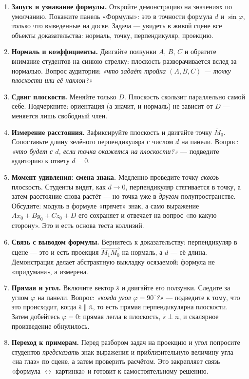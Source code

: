 \begin{enumerate}
  \item \textbf{Запуск и узнавание формулы.} Откройте демонстрацию на
    значениях по умолчанию. Покажите панель «Формулы»: это в точности
    формула $d$ и $\sin\varphi$, только что выведенные на доске. Задача
    --- увидеть в живой сцене все объекты доказательства: нормаль,
    точку, перпендикуляр, проекцию.

  \item \textbf{Нормаль и коэффициенты.} Двигайте ползунки $A$, $B$,
    $C$ и обратите внимание студентов на синюю стрелку: плоскость
    разворачивается вслед за нормалью. Вопрос аудитории: \emph{«что
    задаёт тройка $(A,B,C)$ --- точку плоскости или её наклон?»}

  \item \textbf{Сдвиг плоскости.} Меняйте только $D$. Плоскость
    скользит параллельно самой себе. Подчеркните: ориентация (а значит,
    и нормаль) не зависит от $D$ --- меняется лишь свободный член.

  \item \textbf{Измерение расстояния.} Зафиксируйте плоскость и двигайте
    точку $\bar{M}_0$. Сопоставьте длину зелёного перпендикуляра с
    числом $d$ на панели. Вопрос: \emph{«что будет с $d$, если точка
    окажется на плоскости?»} --- подведите аудиторию к ответу $d=0$.

  \item \textbf{Момент удивления: смена знака.} Медленно проведите точку
    \emph{сквозь} плоскость. Студенты видят, как $d \to 0$, перпендикуляр
    стягивается в точку, а затем расстояние снова растёт --- но точка уже
    в \emph{другом} полупространстве. Обсудите: модуль в формуле «прячет»
    знак, а само выражение $Ax_0+By_0+Cz_0+D$ его сохраняет и отвечает на
    вопрос «по какую сторону». Это и есть основа теста коллизий.

  \item \textbf{Связь с выводом формулы.} Вернитесь к доказательству:
    перпендикуляр в сцене --- это и есть проекция $\overrightarrow{M_1M_0}$
    на нормаль, а $d$ --- её длина. Демонстрация делает абстрактную
    выкладку осязаемой: формула не «придумана», а измерена.

  \item \textbf{Прямая и угол.} Включите вектор $\bar{s}$ и двигайте его
    ползунки. Следите за углом $\varphi$ на панели. Вопрос: \emph{«когда
    угол $\varphi = 90^\circ$?»} --- подведите к тому, что это
    происходит, когда $\bar{s} \parallel \bar{n}$, то есть прямая
    перпендикулярна плоскости. Затем добейтесь $\varphi = 0$: прямая
    легла в плоскость, $\bar{s} \perp \bar{n}$, и скалярное произведение
    обнулилось.

  \item \textbf{Переход к примерам.} Перед разбором задач на проекцию и
    угол попросите студентов \emph{предсказать} знак выражения и
    приблизительную величину угла «на глаз» по сцене, а затем проверить
    расчётом. Это закрепляет связь «формула $\leftrightarrow$ картинка»
    и готовит к самостоятельному решению.
\end{enumerate}
